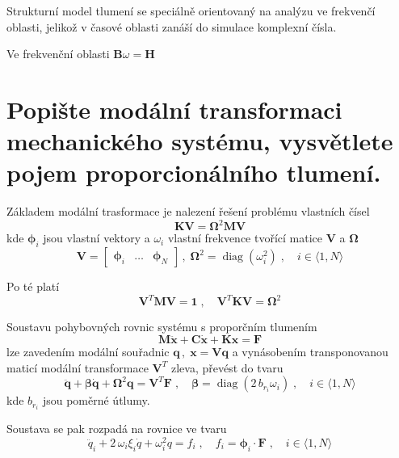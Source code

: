 \documentclass{article}
\begin{document}
	Strukturní model tlumení se speciálně orientovaný na analýzu ve frekvenčí oblasti, jelikož v časové oblasti zanáší do simulace komplexní čísla.

	Ve frekvenční oblasti $\bm{B}\omega = \bm{H}$

	\section{Popište modální transformaci mechanického systému, vysvětlete pojem proporcionálního tlumení. }

	Základem modální trasformace je nalezení řešení problému vlastních čísel
	\begin{equation*}
		\bm{K}\bm{V} = \bm{\Omega}^2 \bm{M} \bm{V}
	\end{equation*}
	kde $\bm{\phi}_i$ jsou vlastní vektory a $\omega_i$ vlastní frekvence tvořící matice $\bm{V}$ a $\bm{\Omega}$  
	\begin{equation*}
		\bm{V} = \begin{bmatrix} \bm{\phi}_i & \dots & \bm{\phi}_N \end{bmatrix}
		\,,\;
		\bm{\Omega}^2 = \operatorname{diag}(\omega_i^2)
		\;,\quad 
		i \in \langle 1,N \rangle
	\end{equation*}

	Po té platí
	\begin{equation*}
		\bm{V}^T\bm{M}\bm{V} = \bm{1}
		\;,\quad 
		\bm{V}^T\bm{K}\bm{V} = \bm{\Omega}^2
	\end{equation*}

	Soustavu pohybovných rovnic systému s proporčním tlumením
	\begin{equation*}
		\bm{M}\bm{\ddot{x}} + \bm{C}\bm{\dot{x}} + \bm{K}\bm{x} = \bm{F}
	\end{equation*}
	lze zavedením modální souřadnic $\bm{q} \,,\; \bm{x} = \bm{V}\bm{q}$ a vynásobením transponovanou maticí modální transformace $\bm{V}^T$ zleva, převést do tvaru
	\begin{equation*}
		\bm{\ddot{q}} + \bm{\beta}\bm{\dot{q}} + \bm{\Omega}^2 \bm{q} = \bm{V}^T \bm{F}
		\;,\quad 
		\bm{\beta} = \operatorname{diag}(2\,b_{r_i}\omega_i) \;,\quad i \in \langle 1,N \rangle
	\end{equation*}
	kde $ b_{r_i}$ jsou poměrné útlumy.

	Soustava se pak rozpadá na rovnice ve tvaru
	\begin{equation*}
		\ddot{q}_i + 2\,\omega_i\xi_i \dot{q} + \omega_i^2 q = f_i
		\;,\quad 
		f_i = \bm{\phi}_i \cdot \bm{F}
		\;,\quad 
		i \in \langle 1,N \rangle
	\end{equation*}
\end{document}
